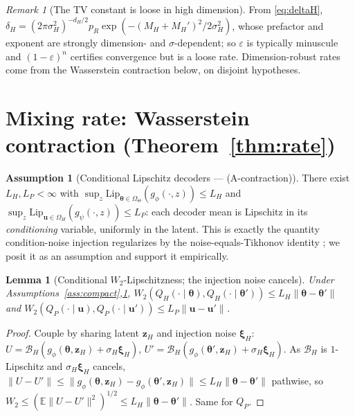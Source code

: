 \documentclass[11pt]{article}
\theoremstyle{plain}
\newtheorem{lemma}[theorem]{Lemma}
\theoremstyle{definition}
\newtheorem{assumption}{Assumption}
\theoremstyle{remark}
\newtheorem{remark}{Remark}
\newcommand{\E}{\mathbb{E}}
\newcommand{\Om}{\Omega}
\newcommand{\bth}{\bm{\theta}}
\newcommand{\bu}{\bm{u}}
\newcommand{\norm}[1]{\lVert #1 \rVert}
\begin{document}
\begin{remark}[The TV constant is loose in high dimension]
\label{rem:scope}
From \eqref{eq:deltaH}, $\delta_H=(2\pi\sigma_H^2)^{-d_H/2}p_R\exp(-(M_H+M_H')^2/2\sigma_H^2)$, whose
prefactor and exponent are strongly dimension- and $\sigma$-dependent; so $\varepsilon$ is typically
minuscule and $(1-\varepsilon)^n$ certifies convergence but is a loose rate. Dimension-robust rates
come from the Wasserstein contraction below, on disjoint hypotheses.
\end{remark}

\section{Mixing rate: Wasserstein contraction (Theorem~\ref{thm:rate})}
\label{sec:rate}

\begin{assumption}[Conditional Lipschitz decoders --- (A-contraction)]
\label{ass:lip}
There exist $L_H,L_P<\infty$ with $\sup_{z}\mathrm{Lip}_{\bth\in\Om_\Theta}(g_\phi(\cdot,z))\le L_H$ and
$\sup_{z}\mathrm{Lip}_{\bu\in\Om_H}(g_\psi(\cdot,z))\le L_P$: each decoder mean is Lipschitz in its
\emph{conditioning} variable, uniformly in the latent. This is exactly the quantity condition-noise
injection regularizes by the noise-equals-Tikhonov identity \citep{bishop1995}; we posit it as an
assumption and support it empirically.
\end{assumption}

\begin{lemma}[Conditional $W_2$-Lipschitzness; the injection noise cancels]
\label{lem:condlip}
Under Assumptions~\ref{ass:compact},\ref{ass:lip}, $W_2(Q_H(\cdot\mid\bth),Q_H(\cdot\mid\bth'))\le
L_H\norm{\bth-\bth'}$ and $W_2(Q_P(\cdot\mid\bu),Q_P(\cdot\mid\bu'))\le L_P\norm{\bu-\bu'}$.
\end{lemma}
\begin{proof}
Couple by sharing latent $\bm z_H$ and injection noise $\bm\xi_H$:
$U=\mathcal B_H(g_\phi(\bth,\bm z_H)+\sigma_H\bm\xi_H)$, $U'=\mathcal B_H(g_\phi(\bth',\bm z_H)+\sigma_H\bm\xi_H)$.
As $\mathcal B_H$ is $1$-Lipschitz and $\sigma_H\bm\xi_H$ cancels,
$\norm{U-U'}\le\norm{g_\phi(\bth,\bm z_H)-g_\phi(\bth',\bm z_H)}\le L_H\norm{\bth-\bth'}$ pathwise, so
$W_2\le(\E\norm{U-U'}^2)^{1/2}\le L_H\norm{\bth-\bth'}$. Same for $Q_P$.
\end{proof}
\end{document}
